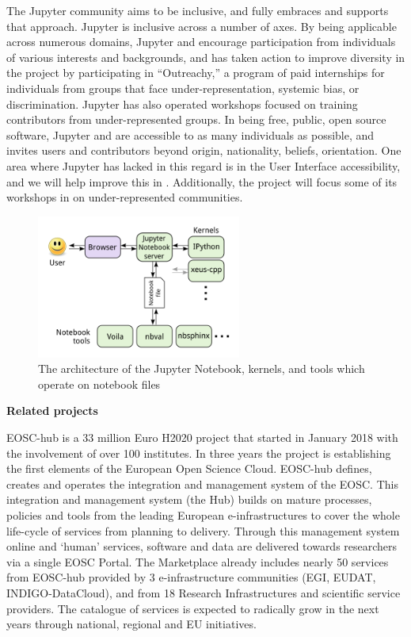 The Jupyter community aims to be inclusive, and \TheProject fully
embraces and supports that approach.  Jupyter is inclusive across a number of axes.
By being applicable across numerous domains, Jupyter and \TheProject
encourage participation from individuals of various interests and
backgrounds, and has taken action to improve diversity in the project
by participating in ``Outreachy,'' a program of paid internships for
individuals from groups that face under-representation, systemic bias,
or discrimination.  Jupyter has also operated workshops focused on
training contributors from under-represented groups.  In being free,
public, open source software, Jupyter and \TheProject are accessible
to as many individuals as possible, and invites users and contributors
beyond origin, nationality, beliefs, orientation.  One area where
Jupyter has lacked in this regard is in the User Interface
accessibility, and we will help improve this in
.  Additionally, the project will
focus some of its workshops in  on
under-represented communities.


\begin{figure}[ht!]\centering
  \includegraphics[width=0.6\textwidth]{images/notebook_components.png}
  \caption{The architecture of the Jupyter Notebook, kernels, and tools
        which operate on notebook files}
  \label{fig:notebook-architecture}
\end{figure}

\medskip
\noindent\textbf{Related projects}

EOSC-hub is a 33 million Euro H2020 project that started in January 2018 with
the involvement of over 100 institutes. In three years the project is
establishing the first elements of the European Open Science Cloud. EOSC-hub
defines, creates and operates the integration and management system of the
EOSC.  This integration and management system (the Hub) builds on mature
processes, policies and tools from the leading European e-infrastructures to
cover the whole life-cycle of services from planning to delivery. Through this
management system online and `human' services, software and data are delivered
towards researchers via a single EOSC Portal. The Marketplace already includes
nearly 50 services from EOSC-hub provided by 3 e-infrastructure communities
(EGI, EUDAT, INDIGO-DataCloud), and from 18 Research Infrastructures and
scientific service providers. The catalogue of services is expected to
radically grow in the next years through national, regional and EU
initiatives.

